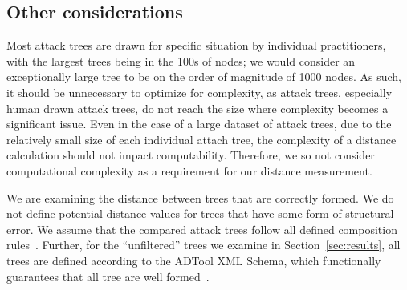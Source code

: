 



\subsection{Other considerations}

Most attack trees are drawn for specific situation by individual practitioners, with the largest trees being in the 100s of nodes; we would consider an exceptionally large tree to be on the order of magnitude of 1000 nodes. As such, it should be unnecessary to optimize for complexity, as attack trees, especially human drawn attack trees, do not reach the size where complexity becomes a significant issue. Even in the case of a large dataset of attack trees, due to the relatively small size of each individual attach tree, the complexity of a distance calculation should not impact computability. Therefore, we so not consider computational complexity as a requirement for our distance measurement.

We are examining the distance between trees that are correctly formed. We do not define potential distance values for trees that have some form of structural error. We assume that the compared attack trees follow all defined composition rules~\cite{mauw_foundations_2006}. Further, for the ``unfiltered'' trees we examine in Section~\ref{sec:results}, all trees are defined according to the ADTool XML Schema, which functionally guarantees that all tree are well formed~\cite{kordy_adtool_2013}.











